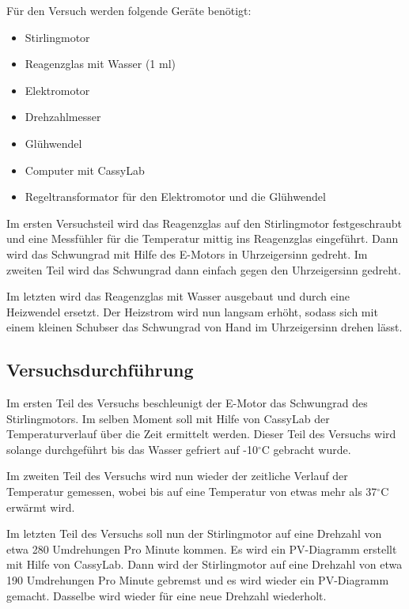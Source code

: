 \documentclass[fontsize=12pt]{scrartcl}
\begin{document}
Für den Versuch werden folgende Geräte benötigt:
\begin{itemize}
\item Stirlingmotor
\item Reagenzglas mit Wasser (1 ml) 
\item Elektromotor
\item Drehzahlmesser
\item Glühwendel
\item Computer mit CassyLab
\item Regeltransformator für den Elektromotor und die Glühwendel
\end{itemize}
\newpage
Im ersten Versuchsteil wird das Reagenzglas auf den Stirlingmotor festgeschraubt und eine Messfühler für die Temperatur mittig ins Reagenzglas eingeführt. Dann wird das Schwungrad mit Hilfe des E-Motors in Uhrzeigersinn gedreht. Im zweiten Teil wird das Schwungrad dann einfach gegen den Uhrzeigersinn gedreht. \par

Im letzten wird das Reagenzglas mit Wasser ausgebaut und durch eine Heizwendel ersetzt. Der Heizstrom wird nun langsam erhöht, sodass sich mit einem kleinen Schubser das Schwungrad von Hand im Uhrzeigersinn drehen lässt.  

\subsection{Versuchsdurchführung}

Im ersten Teil des Versuchs beschleunigt der E-Motor das Schwungrad des Stirlingmotors. Im selben Moment soll mit Hilfe von CassyLab der Temperaturverlauf über die Zeit ermittelt werden. Dieser Teil des Versuchs wird solange durchgeführt bis das Wasser gefriert auf -10$^{\circ}$C gebracht wurde. \par

Im zweiten Teil des Versuchs wird nun wieder der zeitliche Verlauf der Temperatur gemessen, wobei bis auf eine Temperatur von etwas mehr als 37$^{\circ}$C erwärmt wird.\par

Im letzten Teil des Versuchs soll nun der Stirlingmotor auf eine Drehzahl von etwa 280 Umdrehungen Pro Minute kommen. Es wird ein PV-Diagramm erstellt mit Hilfe von CassyLab. Dann wird der Stirlingmotor auf eine Drehzahl von etwa 190 Umdrehungen Pro Minute gebremst und es wird wieder ein PV-Diagramm gemacht. Dasselbe wird wieder für eine neue Drehzahl wiederholt.
\noindent
\newpage
\end{document}

